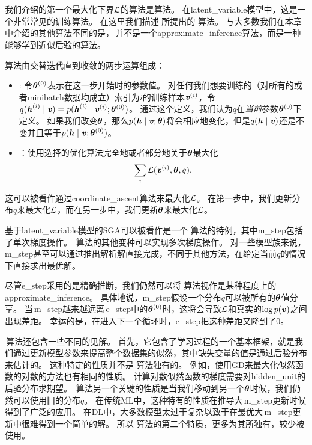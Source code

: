\section{}
\label{sec:expectation_maximization}

我们介绍的第一个最大化下界$\mathcal{L}$的算法是算法。
在\gls{latent_variable}模型中，这是一个非常常见的训练算法。
在这里我们描述 \citet{emview} 所提出的\,\,算法。
与大多数我们在本章中介绍的其他算法不同的是，\,并不是一个\gls{approximate_inference}算法，而是一种能够学到近似后验的算法。


算法由交替迭代直到收敛的两步运算组成：
\begin{itemize}
\item {}: 令${\boldsymbol{\theta}^{(0)}}$表示在这一步开始时的参数值。
对任何我们想要训练的（对所有的或者\gls{minibatch}数据均成立）索引为$i$的训练样本$\boldsymbol{\mathit{v}}^{(i)}$，令$q(\boldsymbol{\mathit{h}}^{(i)}\mid \boldsymbol{\mathit{v}}) = p(\boldsymbol{\mathit{h}}^{(i)}\mid\boldsymbol{\mathit{v}}^{(i)};\boldsymbol{\theta}^{(0)})$。
通过这个定义，我们认为$q$在\emph{当前}参数$\boldsymbol{\theta}^{(0)}$下定义。
如果我们改变$\boldsymbol{\theta}$，那么$p(\boldsymbol{\mathit{h}}\mid\boldsymbol{\mathit{v}};\boldsymbol{\theta})$将会相应地变化，但是$q(\boldsymbol{\mathit{h}}\mid\boldsymbol{\mathit{v}})$还是不变并且等于$p(\boldsymbol{\mathit{h}}\mid\boldsymbol{\mathit{v}};\boldsymbol{\theta}^{(0)})$。
\item {}：使用选择的优化算法完全地或者部分地关于$\boldsymbol{\theta}$最大化
\begin{align}
\sum_i \mathcal{L}(\boldsymbol{\mathit{v}}^{(i)},\boldsymbol{\theta},q).
\end{align}
\end{itemize}


这可以被看作通过\gls{coordinate_ascent}算法来最大化$\mathcal{L}$。
在第一步中，我们更新分布$q$来最大化$\mathcal{L}$，而在另一步中，我们更新$\boldsymbol{\theta}$来最大化$\mathcal{L}$。


基于\gls{latent_variable}模型的\gls{SGA}可以被看作是一个\,\,算法的特例，其中\gls{m_step}包括了单次梯度操作。
\,算法的其他变种可以实现多次梯度操作。
对一些模型族来说，\gls{m_step}甚至可以通过推出解析解直接完成，不同于其他方法，在给定当前$q$的情况下直接求出最优解。


尽管\gls{e_step}采用的是精确推断，我们仍然可以将\,\,算法视作是某种程度上的\gls{approximate_inference}。
具体地说，\gls{m_step}假设一个分布$q$可以被所有的$\boldsymbol{\theta}$值分享。
当\,\gls{m_step}越来越远离\,\gls{e_step}中的$\boldsymbol{\theta}^{(0)}$时，这将会导致$\mathcal{L}$和真实的$\log p(\boldsymbol{\mathit{v}})$之间出现差距。
幸运的是，在进入下一个循环时，\gls{e_step}把这种差距又降到了$0$。



\,算法还包含一些不同的见解。
首先，它包含了学习过程的一个基本框架，就是我们通过更新模型参数来提高整个数据集的似然，其中缺失变量的值是通过后验分布来估计的。
这种特定的性质并不是\,\,算法独有的。
例如，使用\gls{GD}来最大化似然函数的对数的方法也有相同的性质。
计算对数似然函数的梯度需要对\gls{hidden_unit}的后验分布求期望。 
\,算法另一个关键的性质是当我们移动到另一个$\boldsymbol{\theta}$时候，我们仍然可以使用旧的分布$q$。
在传统\gls{ML}中，这种特有的性质在推导大\,\gls{m_step}更新时候得到了广泛的应用。
在\gls{DL}中，大多数模型太过于复杂以致于在最优大\,\gls{m_step}更新中很难得到一个简单的解。
所以\,\,算法的第二个特质，更多为其所独有，较少被使用。



